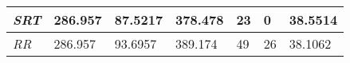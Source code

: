 \documentclass{article}
\begin{document}
\begin{table}[h!]
\begin{tabular}{|l|l|l|l|l|l|l|}
  \textit{SRT}       & 286.957                                                                          & 87.5217                                                                     & 378.478                                                                            & 23                                                                                    & 0                                                                                   & 38.5514                                                                    \\ \hline
  \textit{RR}        & 286.957                                                                          & 93.6957                                                                     & 389.174                                                                            & 49                                                                                    & 26                                                                                  & 38.1062                                                                    \\ \hline
  \end{tabular}
\end{table}
\end{document}
